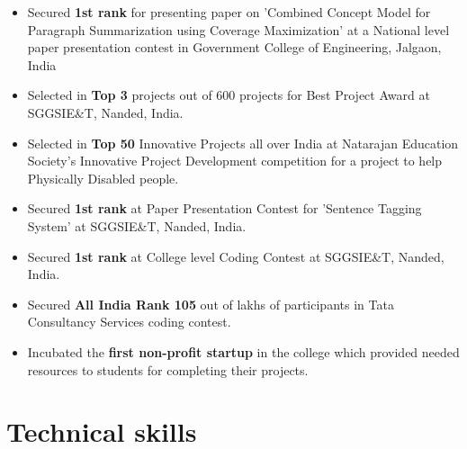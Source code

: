 \documentclass[11pt,a4paper,sans]{moderncv}        %
\begin{document}
\begin{itemize}
\item {Secured \textbf{1st rank} for presenting paper on 'Combined Concept Model for Paragraph Summarization using Coverage Maximization' at a National level paper presentation contest in Government College of Engineering, Jalgaon, India }
\vspace{3pt}
\item {Selected in \textbf{Top 3} projects out of 600 projects for Best Project Award at SGGSIE\&T, Nanded, India.}
\vspace{3pt}
\item {Selected in \textbf{Top 50} Innovative Projects all over India at Natarajan Education Society's
Innovative Project Development competition for a project to help Physically Disabled people.}
\vspace{3pt}
\item {Secured \textbf{1st rank} at Paper Presentation Contest for 'Sentence Tagging System' at SGGSIE&T, Nanded, India.}
\vspace{3pt}
\item {Secured \textbf{1st rank} at College level Coding Contest at SGGSIE&T, Nanded, India.}
\vspace{3pt}
\item {Secured \textbf{All India Rank 105} out of lakhs of participants in Tata Consultancy Services coding contest.}
\vspace{3pt}
\item {Incubated the \textbf{first non-profit startup} in the college which provided needed resources to students for completing their projects.}

\end{itemize}


\section{Technical skills}

\vspace{3pt}
\end{document}
